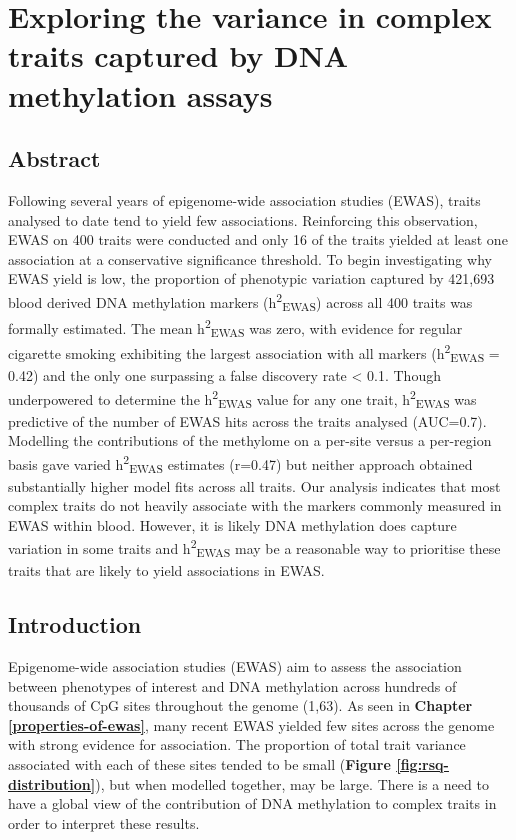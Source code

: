 \documentclass[11pt,oneside]{bristolthesis}
\begin{document}
\hypertarget{h2ewas-chapter}{%
\chapter{Exploring the variance in complex traits captured by DNA methylation assays}\label{h2ewas-chapter}}

\hypertarget{abstract-05}{%
\section{Abstract}\label{abstract-05}}

Following several years of epigenome-wide association studies (EWAS), traits analysed to date tend to yield few associations. Reinforcing this observation, EWAS on 400 traits were conducted and only 16 of the traits yielded at least one association at a conservative significance threshold. To begin investigating why EWAS yield is low, the proportion of phenotypic variation captured by 421,693 blood derived DNA methylation markers (h\textsuperscript{2}\textsubscript{EWAS}) across all 400 traits was formally estimated. The mean h\textsuperscript{2}\textsubscript{EWAS} was zero, with evidence for regular cigarette smoking exhibiting the largest association with all markers (h\textsuperscript{2}\textsubscript{EWAS} = 0.42) and the only one surpassing a false discovery rate \textless{} 0.1. Though underpowered to determine the h\textsuperscript{2}\textsubscript{EWAS} value for any one trait, h\textsuperscript{2}\textsubscript{EWAS} was predictive of the number of EWAS hits across the traits analysed (AUC=0.7). Modelling the contributions of the methylome on a per-site versus a per-region basis gave varied h\textsuperscript{2}\textsubscript{EWAS} estimates (r=0.47) but neither approach obtained substantially higher model fits across all traits. Our analysis indicates that most complex traits do not heavily associate with the markers commonly measured in EWAS within blood. However, it is likely DNA methylation does capture variation in some traits and h\textsuperscript{2}\textsubscript{EWAS} may be a reasonable way to prioritise these traits that are likely to yield associations in EWAS.

\hypertarget{introduction-05}{%
\section{Introduction}\label{introduction-05}}

Epigenome-wide association studies (EWAS) aim to assess the association between phenotypes of interest and DNA methylation across hundreds of thousands of CpG sites throughout the genome (1,63). As seen in \textbf{Chapter \ref{properties-of-ewas}}, many recent EWAS yielded few sites across the genome with strong evidence for association. The proportion of total trait variance associated with each of these sites tended to be small (\textbf{Figure \ref{fig:rsq-distribution}}), but when modelled together, may be large. There is a need to have a global view of the contribution of DNA methylation to complex traits in order to interpret these results.
\end{document}
